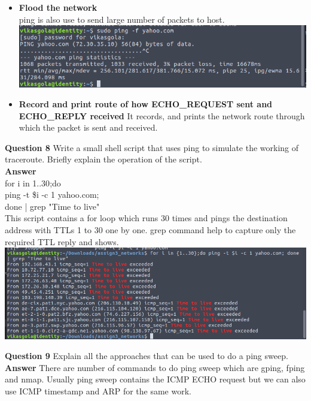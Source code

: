 \documentclass[14pt]{extarticle}
\begin{document}
\begin{itemize}
        \item \textbf{Flood the network}\\
        ping is also use to send large number of packets to host.\\
        \includegraphics[scale=0.5]{7_4}
        \item \textbf{Record and print route of how ECHO\_REQUEST sent and ECHO\_REPLY received}
        It records, and prints the network route through which the packet is sent and received.
    \end{itemize}
    \vspace{1cm}

    \noindent
    \textbf{\large Question 8}
    Write a small shell script that uses ping to simulate the working of traceroute. Briefly explain the
    operation of the script.\\[10pt]
    \textbf{\large Answer}\\
    \indent
    \textmd{for i in {1..30};do\\
    \indent
    ping -t \$i -c 1 yahoo.com;\\
    \indent
    done
    \indent | grep "Time to live"}\\
    This script contains a for loop which runs 30 times and pings the destination address with TTLs 1 to 30 one by one. grep command help to capture only the required TTL reply and shows.\\[10pt]
    \includegraphics[scale=0.5]{8}
    \vspace{1cm}

    \noindent
    \textbf{\large Question 9}
    Explain all the approaches that can be used to do a ping sweep.\\[10pt]
    \textbf{\large Answer}
    There are number of commands to do ping sweep which are gping, fping and nmap. Usually ping sweep contains the ICMP ECHO request but we can also use ICMP timestamp and ARP for the same work.
    \vspace{1cm}
    
\end{document}
